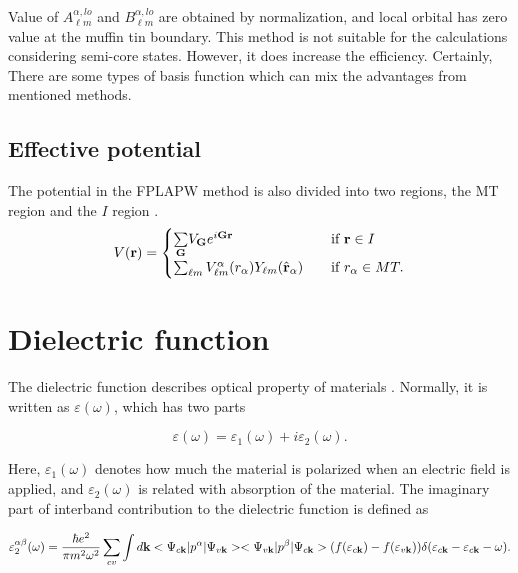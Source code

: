 \documentclass[a4paper, 12pt, titlepage,oneside,drop]{kthesis}
\begin{document}
Value of $A _{{\ell}m}^{\alpha,lo}$ and $B _{{\ell}m}^{\alpha,lo}$ are obtained by normalization, and local orbital has zero value at the muffin tin boundary. This method is not suitable for the calculations considering semi-core states.
However, it does increase the efficiency. Certainly, There are some types of basis function which can mix the advantages from mentioned methods.

\subsection{Effective potential}

\label{epote}
The potential in the FPLAPW method is also divided into two regions, the MT region and the $I$ region \cite{nordstrom2006planewaves}.
\begin{equation*}\label{lap7}
V(\textbf{r}) = 
\begin{cases} \sumg<{\textbf G}> V_{\textbf G} e^{i {\textbf G} {\textbf {r}  }} & \quad \mbox{if $\textbf{r} \in {I} $}
\\
 \sum_{{\ell}m} V_{{\ell}m}^{\alpha} (r_{\alpha}) Y_{{\ell}m}(\hat{{\textbf r}}_{\alpha})  & \quad \mbox{if $r_{\alpha} \in MT. $}\\ 
\end{cases}
\end{equation*}

\section{Dielectric function}
The dielectric function describes optical property of materials \cite{penn1962wave, fox2002optical}. Normally, it is written as $\varepsilon(\omega)$, which has two parts

\begin{equation}
 \varepsilon(\omega) = \varepsilon_1(\omega) + i \varepsilon_2(\omega).
\end{equation}

Here, $\varepsilon_1(\omega)$ denotes how much the material is polarized when an electric field is applied, and $\varepsilon_2(\omega)$ is related with absorption of the material. The imaginary part of interband contribution to the dielectric function is defined as

\begin{equation}\label{df2}
\varepsilon_2^{\alpha\beta} (\omega)= \frac{\hbar e^2}{\pi m^2\omega^2} \sum_{cv} \int d \textbf {k} <\Psi_{c{\textbf k}}|p^\alpha|\Psi_{v{\textbf k}}><\Psi_{v{\textbf k}}|p^\beta|\Psi_{c{\textbf k}}> (f(\varepsilon_{c \textbf k})-f(\varepsilon_{v \textbf k}))\delta(\varepsilon_{c {\textbf k}}-\varepsilon_{c{\textbf k}}-\omega).
\end{equation}
\end{document}
